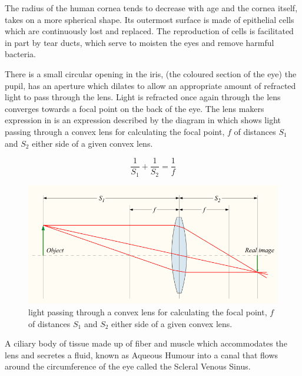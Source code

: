 The radius of the human cornea tends to decrease with age and the cornea
itself, takes on a more spherical shape.\cite{guirao2000optical} Its
outermost surface is made of epithelial cells which are continuously lost
and replaced.\cite{jester1999cellular,hassell2010molecular} The reproduction
of cells is facilitated in part by tear ducts, which  serve to moisten the
eyes and remove harmful bacteria.\cite{holly1977tear}

There is a small circular opening in the iris, (the coloured section of
the eye) the pupil, has an aperture which dilates to allow an appropriate
amount of refracted light to pass through the lens. Light is refracted
once again through the lens converges towards a focal point on the back
of the eye. The lens makers expression in  is an
expression described by the diagram in  which
shows light passing through a convex lens for calculating the focal point,
$f$ of distances $S_1$ and $S_2$ either side of a given convex lens.
\cite{greivenkamp2004field}

\begin{equation}
\frac{1}{S_1} + \frac{1}{S_2} = \frac{1}{f}
\label{eq:lens_makers}
\end{equation}

\begin{figure}[htbp]
  \centering
    \includegraphics{figures/convergent_lens2}
  \caption{light passing through a convex lens for calculating the focal
  point, $f$ of distances $S_1$ and $S_2$ either side of a given convex lens.}
  \label{fig:convergent_lens}
\end{figure}

A ciliary body of tissue made up of fiber and muscle which accommodates the
lens and secretes a fluid, known as Aqueous Humour into a canal that flows
around the circumference of the eye called the Scleral Venous Sinus.
\cite{bill1970effects,dvorak1934schlemm}

